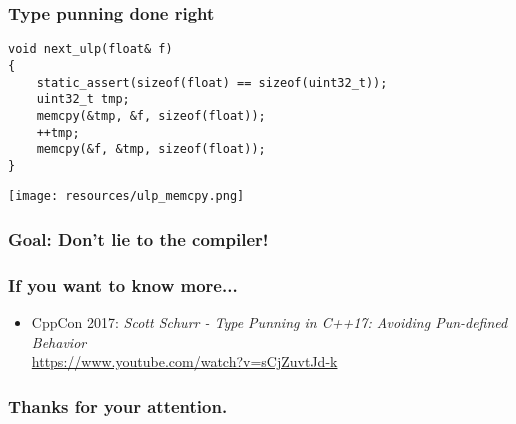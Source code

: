 \documentclass[aspectratio=169]{beamer}
\newif\iftransitions
\begin{document}
\begin{frame}[fragile]
  \frametitle{Type punning done right}

  \iftransitions
  \setbeamercolor{alerted text}{fg=red}
  \setbeamerfont{alerted text}{series=\bfseries,family=\ttfamily}
  \begin{semiverbatim}
\uncover<1->{\alert<0>{{\color{blue}void} next_ulp({\color{blue}float}& f)}}
\uncover<1->{\alert<0>{\{}}
\uncover<3->{\alert<0>{    {\color{blue}static_assert}({\color{blue}sizeof}({\color{blue}float}) == {\color{blue}sizeof}(uint32_t));}}
\uncover<2->{\alert<0>{    uint32_t tmp;}}
\uncover<4->{\alert<0>{    memcpy(&tmp, &f, {\color{blue}sizeof}({\color{blue}float}));}}
\uncover<2->{\alert<0>{    ++tmp;}}
\uncover<5->{\alert<0>{    memcpy(&f, &tmp, {\color{blue}sizeof}({\color{blue}float}));}}
\uncover<1->{\alert<0>{\}}}
  \end{semiverbatim}
  \else
  
  \begin{lstlisting}
void next_ulp(float& f)
{
    static_assert(sizeof(float) == sizeof(uint32_t));
    uint32_t tmp;
    memcpy(&tmp, &f, sizeof(float));
    ++tmp;
    memcpy(&f, &tmp, sizeof(float));
}
  \end{lstlisting}
  \fi
  
  \iftransitions \uncover<6->{\texttt{[image: resources/ulp\_memcpy.png]}} \else \texttt{[image: resources/ulp\_memcpy.png]} \fi

\end{frame}


\begin{frame}[fragile]
  \frametitle{Goal: Don't lie to the compiler!}
\end{frame}

\begin{frame}
  \frametitle{If you want to know more...}

  \begin{itemize}
  \item CppCon 2017: \emph{Scott Schurr - Type Punning in C++17: Avoiding Pun-defined Behavior} \\ \href{https://www.youtube.com/watch?v=sCjZuvtJd-k}{https://www.youtube.com/watch?v=sCjZuvtJd-k}
  \end{itemize}
    
\end{frame}

\begin{frame}
  \frametitle{Thanks for your attention.}
\end{frame}
\end{document}
